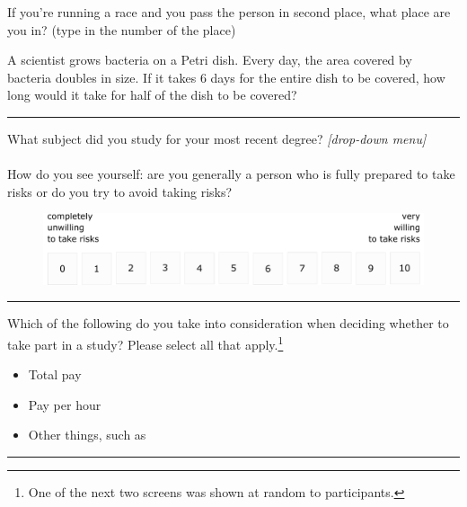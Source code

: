 \noindent If you're running a race and you pass the person in second place, what place are you in? (type in the number of the place)\\
\framebox[0.1\textwidth]{\rule{0pt}{15pt}}

\noindent A scientist grows bacteria on a Petri dish.
Every day, the area covered by bacteria doubles in size.
If it takes 6 days for the entire dish to be covered, how long would it take for half of the dish to be covered?\\
\framebox[0.1\textwidth]{\rule{0pt}{15pt}}

\bigskip
\noindent \rule{\linewidth}{0.4pt}

\noindent What subject did you study for your most recent degree? \textit{[drop-down menu]}\\
\\
\noindent How do you see yourself: are you generally a person who is fully prepared to take risks or do you try to avoid taking risks?
\begin{figure}[h!]
	\centering
	{\includegraphics[width=\linewidth]{RiskAversion.pdf}}
\end{figure}

\bigskip
\noindent \rule{\linewidth}{0.4pt}

\noindent Which of the following do you take into consideration when deciding whether to take part in a study?
Please select all that apply.\footnote{
One of the next two screens was shown at random to participants.
}
\begin{itemize}
\item Total pay
\item Pay per hour
\item Other things, such as \\
\framebox[\textwidth]{\rule{0pt}{15pt}}
\end{itemize}

\bigskip
\noindent \rule{\linewidth}{0.4pt}

